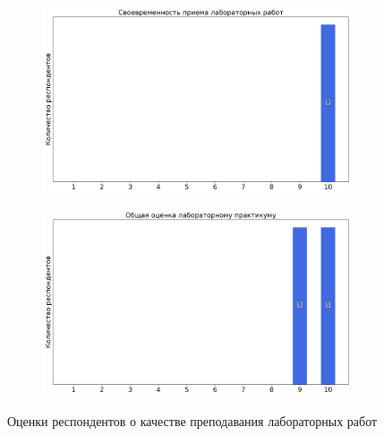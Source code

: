 \begin{figure}[H]
\begin{subfigure}[b]{0.45\textwidth}
				\includegraphics[width=\textwidth]{images/2 course/Общая физика - электричество и магнетизм/labniks-marks-Тимирханов Р.А.-2.png}
			\end{subfigure}
			\begin{subfigure}[b]{0.45\textwidth}
				\centering
				\includegraphics[width=\textwidth]{images/2 course/Общая физика - электричество и магнетизм/labniks-marks-Тимирханов Р.А.-3.png}
			\end{subfigure}	
			\caption{Оценки респондентов о качестве преподавания лабораторных работ}
		\end{figure}


